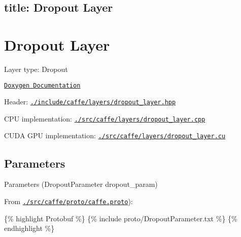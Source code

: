 

 \subsection*{title\+: Dropout Layer }

\section*{Dropout Layer}


\begin{DoxyItemize}
\item Layer type\+: {\ttfamily Dropout}
\item \href{http://caffe.berkeleyvision.org/doxygen/classcaffe_1_1DropoutLayer.html}{\tt Doxygen Documentation}
\item Header\+: \href{https://github.com/BVLC/caffe/blob/master/include/caffe/layers/dropout_layer.hpp}{\tt {\ttfamily ./include/caffe/layers/dropout\+\_\+layer.hpp}}
\item C\+PU implementation\+: \href{https://github.com/BVLC/caffe/blob/master/src/caffe/layers/dropout_layer.cpp}{\tt {\ttfamily ./src/caffe/layers/dropout\+\_\+layer.cpp}}
\item C\+U\+DA G\+PU implementation\+: \href{https://github.com/BVLC/caffe/blob/master/src/caffe/layers/dropout_layer.cu}{\tt {\ttfamily ./src/caffe/layers/dropout\+\_\+layer.cu}}
\end{DoxyItemize}

\subsection*{Parameters}


\begin{DoxyItemize}
\item Parameters ({\ttfamily Dropout\+Parameter dropout\+\_\+param})
\item From \href{https://github.com/BVLC/caffe/blob/master/src/caffe/proto/caffe.proto}{\tt {\ttfamily ./src/caffe/proto/caffe.proto}})\+:
\end{DoxyItemize}

\{\% highlight Protobuf \%\} \{\% include proto/\+Dropout\+Parameter.\+txt \%\} \{\% endhighlight \%\} 